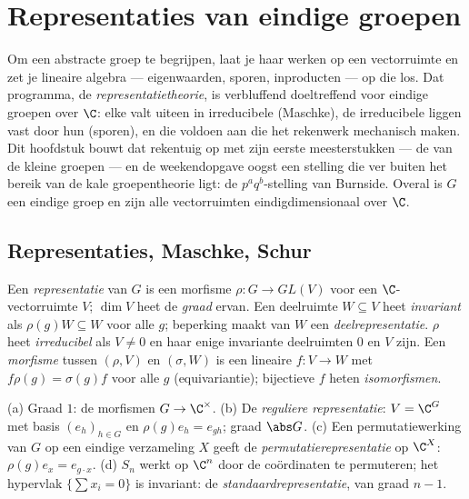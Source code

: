 \chapter{Representaties van eindige groepen}\label{ch:b3:representations}

Om een abstracte groep te begrijpen, laat je haar werken op een
vectorruimte en zet je lineaire algebra --- eigenwaarden, sporen,
inproducten --- op die  los. Dat programma, de
\emph{representatietheorie}, is verbluffend doeltreffend voor
eindige groepen over $\C$: elke  valt uiteen in
irreducibele (Maschke), de irreducibele liggen vast door hun
\emph{} (sporen), en die  voldoen aan
 die het rekenwerk mechanisch maken. Dit
hoofdstuk bouwt dat rekentuig op met zijn eerste meesterstukken
--- de  van de kleine groepen --- en de
weekendopgave oogst een stelling die ver buiten het bereik van de
kale groepentheorie ligt: de $p^aq^b$-stelling van Burnside.
Overal is $G$ een eindige groep en zijn alle vectorruimten
eindigdimensionaal over $\C$.

\section{Representaties, Maschke, Schur}

\begin{definition}\label{def:b3:representations:rep}
Een \emph{representatie} van $G$ is een
morfisme $\rho \colon G \to GL(V)$ voor een $\C$-vectorruimte $V$;
$\dim V$ heet de \emph{graad} ervan. Een deelruimte $W \subseteq
V$ heet \emph{invariant} als $\rho(g)W \subseteq W$ voor alle $g$;
beperking maakt van $W$ een \emph{deelrepresentatie}. $\rho$ heet
\emph{irreducibel} als $V \neq
0$ en haar enige invariante deelruimten $0$ en $V$ zijn. Een
\emph{morfisme} tussen $(\rho, V)$ en $(\sigma, W)$ is een
lineaire $f\colon V \to W$ met $f\rho(g) = \sigma(g)f$ voor alle
$g$ (equivariantie); bijectieve $f$ heten \emph{isomorfismen}.
\end{definition}

\begin{example}\label{ex:b3:representations:examples}
(a) Graad $1$: de morfismen $G \to \C^\times$.
(b) De \emph{reguliere representatie}: $V = \C^G$ met basis $(e_h)_{h \in G}$ en
$\rho(g)e_h = e_{gh}$; graad $\abs G$.
(c) Een permutatiewerking van $G$ op een eindige verzameling $X$
geeft de \emph{permutatierepresentatie} op $\C^X$: $\rho(g)e_x =
e_{g\cdot x}$.
(d) $S_n$ werkt op $\C^n$ door de coördinaten te permuteren; het
hypervlak $\{\sum x_i = 0\}$ is invariant: de
\emph{standaardrepresentatie}, van graad $n - 1$.
\end{example}

